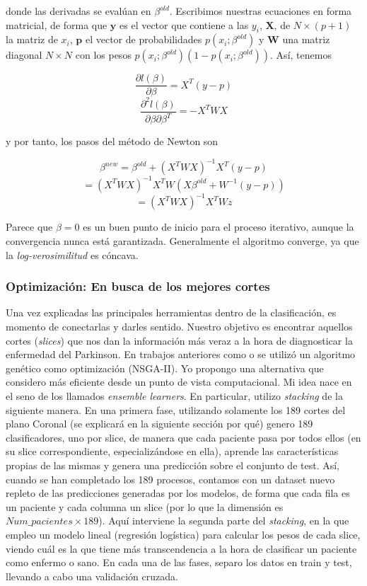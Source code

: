   donde las derivadas se evalúan en $\beta^{old}$. Escribimos nuestras ecuaciones en forma matricial, de forma que $\textbf{y}$ es el vector que contiene a las $y_i$, $\textbf{X}$, de $N \times (p+1)$ la matriz de $x_i$, $\textbf{p}$   el vector de probabilidades $p(x_i;\beta^{old})$ y $\textbf{W}$ una matriz diagonal $N \times N$ con los pesos $p(x_i;\beta^{old})(1-p(x_i;\beta^{old}))$. Así, tenemos
  
  $$\frac{\partial l(\beta)}{\partial \beta} = X^T(y-p)$$
  $$\frac{\partial^2 l(\beta)}{\partial \beta \partial \beta^T} = -X^TWX$$
  
  y por tanto, los pasos del método de Newton son
  
  $$\beta^{new} = \beta^{old} + (X^TWX)^{-1}X^T(y-p)$$
  $$ = (X^TWX)^{-1} X^T W(X \beta^{old}+W^{-1}(y-p))$$
  $$ = (X^TWX)^{-1} X^T Wz$$
  
  Parece que $\beta = 0$ es un buen punto de inicio para el proceso iterativo, aunque la convergencia nunca está garantizada. Generalmente el algoritmo converge, ya que la \textit{log-verosimilitud} es cóncava.
  
\subsubsection{Optimización: En busca de los mejores cortes}

Una vez explicadas las principales herramientas dentro de la clasificación, es momento de conectarlas y darles sentido. Nuestro objetivo es encontrar aquellos cortes (\textit{slices}) que nos dan la información más veraz a la hora de diagnosticar la enfermedad del Parkinson. En trabajos anteriores como  \cite{irojas} o \cite{alberto}  se utilizó un algoritmo genético como optimización (NSGA-II). Yo propongo una alternativa que considero más eficiente desde un punto de vista computacional. Mi idea nace en el seno de los llamados \textit{ensemble learners}. En particular, utilizo \textit{stacking} de la siguiente manera. En una primera fase, utilizando solamente los 189 cortes del plano Coronal (se explicará en la siguiente sección por qué) genero 189 clasificadores, uno por slice, de manera que cada  paciente pasa por todos ellos (en su slice correspondiente, especializándose en ella), aprende las características propias de las mismas y genera una predicción sobre el conjunto de test. Así, cuando se han completado los 189 procesos, contamos con un dataset nuevo repleto de las predicciones generadas por los modelos, de forma que cada fila es un paciente y cada columna un slice (por lo que la dimensión es $Num\_pacientes \times 189$). Aquí interviene la segunda parte del \textit{stacking}, en la que empleo un modelo lineal (regresión logística) para calcular los pesos de cada slice, viendo cuál es la que tiene más transcendencia a la hora de clasificar un paciente como enfermo o sano. En cada una de las fases, separo los datos en train y test, llevando a cabo una validación cruzada. 

